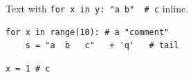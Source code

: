 \documentclass{article}
\begin{document}
Text with \lstinline[breaklines=false]|for x in y: "a b"  # c| inline.
\begin{lstlisting}
for x in range(10):	# a "comment"
    s = "a  b	c"   + 'q'   # tail
\end{lstlisting}
\begin{lstlisting}[basicstyle=\color{blue},columns=flexible]
x = 1 # c
\end{lstlisting}
\end{document}
